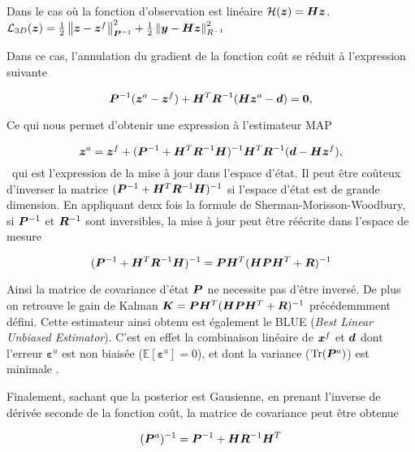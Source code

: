 Dans le cas où la fonction d'observation est linéaire $\mathcal H(\bm z) = \bm{H} \bm z$.
$\mathcal L_{3D}(\bm z) = \frac{1}{2}\left\lVert \bm z-\bm z^f \right\rVert_{\bm{P}^{-1}}^2+ \frac{1}{2}\left\lVert \bm{y}-\bm{H} \bm z \right\rVert^2_{R^{-1}}$

Dans ce cas, l'annulation du gradient de la fonction coût se réduit à l'expression suivante

\begin{equation*}
    \bm{P}^{-1} (\bm z^a - \bm z^f) + \bm{H}^T \bm{R}^{-1}(\bm{H} \bm z^a - \bm d) = \bm 0,
\end{equation*}

Ce qui nous permet d'obtenir une expression à l'estimateur MAP

\begin{equation*}
    \bm z^a = \bm z^f + (\bm{P}^{-1} + \bm{H}^T \bm{R}^{-1} \bm{H})^{-1} \bm{H}^T \bm{R}^{-1} (\bm{d} - \bm{H} \bm z^f),
\end{equation*}~qui est l'expression de la mise à jour dans l'espace d'état. Il peut être coûteux d'inverser la matrice $(\bm{P}^{-1} + \bm{H}^T \bm{R}^{-1} \bm{H})^{-1}$ si l'espace d'état est de grande dimension. En appliquant deux fois la formule de Sherman-Morisson-Woodbury, si $\bm{P}^{-1}$ et $\bm{R}^{-1}$ sont inversibles, la mise à jour peut être réécrite dans l'espace de mesure

\begin{equation*}
    (\bm{P}^{-1} + \bm{H}^T \bm{R}^{-1} \bm{H})^{-1} = \bm{P} \bm{H}^T (\bm{H} \bm{P} \bm{H}^T + \bm{R})^{-1}
\end{equation*}

Ainsi la matrice de covariance d'état $\bm{P}$ ne necessite pas d'être inversé. De plus on retrouve le gain de Kalman $\bm{K} = \bm{P} \bm{H}^T (\bm{H} \bm{P} \bm{H}^T + \bm{R})^{-1}$ précédemmment défini. Cette estimateur ainsi obtenu est également le BLUE (\textit{Best Linear Unbiased Estimator}). C'est en effet la combinaison linéaire de $\bm{x}^f$ et $\bm{d}$ dont l'erreur $\bm \varepsilon^a$ est non biaisée ($\mathbb{E}[\bm \varepsilon^a] = 0$), et dont la variance ($\operatorname{Tr}(\bm{P}^a)$) est minimale .

Finalement, sachant que la posterior est Gausienne, en prenant l'inverse de dérivée seconde de la fonction coût, la matrice de covariance peut être obtenue

\begin{equation*}
    (\bm{P}^a)^{-1} = \bm{P}^{-1} + \bm{H} \bm{R}^{-1} \bm{H}^T
\end{equation*}

